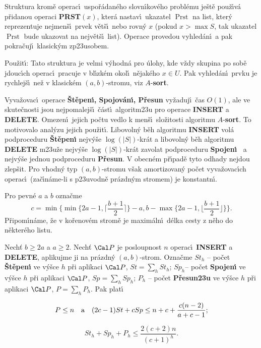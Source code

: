 \documentclass[a4paper,12pt]{article}
\def \emph#1{\underbar{#1}}
\DeclareMathOperator*{\Prst}{Prst}
\begin{document}
\flushpar Struktura krom\v e operac\'\i\ uspo\v r\'adan\'eho 
slovn\'\i kov\'eho prob\-l\'e\-mu 
je\v st\v e pou\v z\'\i v\'a p\v ridanou ope\-raci {\bf PRST$(x)$}, kter\'a nastav\'\i\ ukazatel 
$\Prst$ na list, kter\'y reprezentuje nejmen\v s\'\i\ prvek v\v et\v s\'\i\ 
nebo rovn\'y $x$ (pokud $x>\max S$, tak ukazatel $\Prst$ bude 
ukazovat na nejv\v et\v s\'\i\ list). Operace provedou vyhled\'an\'\i\ a 
pak pokra\v cuj\'\i\ klasick\'ym zp\accent23usobem.
\medskip

\flushpar Pou\v zit\'\i : Tato struktura je velmi v\'yhodn\'a pro 
\'ulohy, kde v\v zdy skupina po sob\v e jdouc\'\i ch ope\-rac\'\i\  
pracuje v bl\'\i zk\'em okol\'\i\ n\v eja\-k\'e\-ho $x\in U$. Pak 
vyhled\'an\'\i\ prvku je rychlej\v s\'\i\ ne\v z v klasick\'em 
$(a,b)$-stromu, viz $A$-{\bf sort}.
\medskip

\flushpar Vyva\v zovac\'\i\ operace {\bf \v St\v epen\'\i , Spojov\'an\'\i , P\v resun }
vy\v zaduj\'\i\ \v cas $O(1)$, ale ve skute\v cnosti jsou nejpomalej\v s\'\i\ 
\v c\'ast\'\i\ 
algoritm\accent23u pro operace {\bf INSERT} a {\bf DELETE}.  Omezen\'\i\ 
jejich po\v ctu vedlo k men\v s\'\i\ slo\v zitosti algoritmu $A$-{\bf sort}.  To motivovalo anal\'yzu 
jejich pou\v zit\'\i .\newline 
Libovoln\'y b\v eh algoritmu {\bf INSERT }
vol\'a podproceduru {\bf \v St\v epe\-n\'\i} nejv\'y\v se $\log(|
S|)$-kr\'at a libovoln\'y b\v eh 
algoritmu  {\bf DELETE} m\accent23u\-\v ze nejv\'y\v se $\log(|S|
)$-kr\'at zavolat podproceduru 
{\bf Spojen\'\i\ }
a nejv\'y\v se jednou podproceduru {\bf P\v resun}.  V obecn\'em 
p\v r\'\i pad\v e tyto od\-ha\-dy nejdou zlep\v sit.  Pro vhodn\'y typ 
$(a,b)$-stromu v\v sak amortizovan\'y po\v cet vyva\v zovac\'\i ch 
ope\-rac\'\i\ (za\v c\'\i n\'ame-li s  
p\accent23u\-vod\-n\v e pr\'az\-dn\'ym stromem) je konstantn\'\i .
\medskip

\flushpar Pro pevn\'e $a$ a $b$ ozna\v cme 
$$c=\min\{\min\{2a-1,\lceil\frac {b+1}2\rceil \}-a,b-\max\{2a-1,\lfloor\frac {
b+1}2\rfloor \}\}.$$
P\v ripom\'\i n\'ame, \v ze \emph{v\'y\v ska} \emph{vrcholu} v ko\v renov\'em strom\v e je 
maxim\'aln\'\i\ d\'elka cesty z n\v eho do n\v ekter\'eho listu.
\medskip

\proclaim{V\v eta}Nech\v t $b\ge 2a$ a $a\ge 2$. Nech\v t $\Cal P$ je 
posloupnost $n$ operac\'\i\ {\bf INSERT} a {\bf DELETE}, aplikujme ji na 
pr\'azdn\'y $(a,b)$-strom. Ozna\v cme\newline 
$St_h$ -- po\v cet {\bf \v St\v epen\'\i} ve v\'y\v sce $h$ p\v ri aplikaci $
\Cal P$, $St=\sum_hSt_h$;\newline 
$Sp_h$-- po\v cet {\bf Spojen\'\i} ve v\'y\v sce $h$ p\v ri aplikaci $
\Cal P$, 
$Sp=\sum_hSp_h$;\newline 
$P_h$ -- po\v cet {\bf P\v resun\accent23u} ve v\'y\v sce $h$ p\v ri aplikaci $
\Cal P$, 
$P=\sum_hP_h$.\newline 
Pak plat\'\i
\roster
\item
$$P\le n\quad \text{\rm a}\quad (2c-1)St+cSp\le n+c+\frac {c(n-2)}{a+c-1};$$
\item
$$St_h+Sp_h+P_h\le\frac {2(c+2)n}{(c+1)^h}.$$
\endroster
\endproclaim
\end{document}
